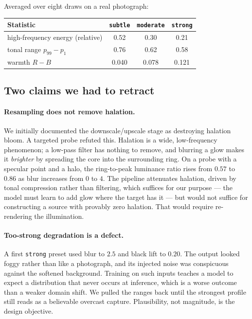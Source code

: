 \documentclass[11pt,a4paper]{article}
\newcommand{\code}[1]{\texttt{#1}}
\begin{document}
Averaged over eight draws on a real photograph:

\begin{center}
\begin{tabular}{@{}lccc@{}}
\toprule
Statistic & \code{subtle} & \code{moderate} & \code{strong} \\
\midrule
high-frequency energy (relative) & 0.52 & 0.30 & 0.21 \\
tonal range $p_{99}-p_1$         & 0.76 & 0.62 & 0.58 \\
warmth $R-B$                     & 0.040 & 0.078 & 0.121 \\
\bottomrule
\end{tabular}
\end{center}

\subsection{Two claims we had to retract}

\paragraph{Resampling does not remove halation.} We initially documented the
downscale/upscale stage as destroying halation bloom. A targeted probe refuted
this. Halation is a wide, low-frequency phenomenon; a low-pass filter has nothing
to remove, and blurring a glow makes it \emph{brighter} by spreading the core
into the surrounding ring. On a probe with a specular point and a halo, the
ring-to-peak luminance ratio rises from $0.57$ to $0.86$ as blur increases from
$0$ to $4$. The pipeline attenuates halation, driven by tonal compression rather
than filtering, which suffices for our purpose --- the model must learn to add
glow where the target has it --- but would not suffice for constructing a source
with provably zero halation. That would require re-rendering the illumination.

\paragraph{Too-strong degradation is a defect.} A first \code{strong} preset used
blur to $2.5$ and black lift to $0.20$. The output looked foggy rather than like a
photograph, and its injected noise was conspicuous against the softened
background. Training on such inputs teaches a model to expect a distribution that
never occurs at inference, which is a worse outcome than a weaker domain shift.
We pulled the ranges back until the strongest profile still reads as a believable
overcast capture. Plausibility, not magnitude, is the design objective.
\end{document}
